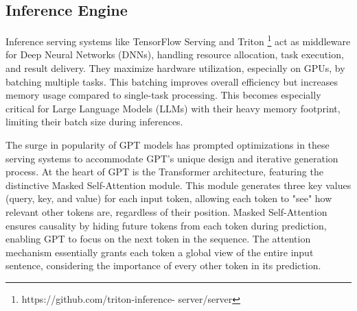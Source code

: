 

\subsection{Inference Engine}

Inference serving systems like TensorFlow Serving \cite{olston2017tensorflow} and Triton \footnote{https://github.com/triton-inference-
server/server} act as middleware for Deep Neural Networks (DNNs), handling resource allocation, task execution, and result delivery. They maximize hardware utilization, especially on GPUs, by batching multiple tasks. This batching improves overall efficiency but increases memory usage compared to single-task processing. This becomes especially critical for Large Language Models (LLMs) with their heavy memory footprint, limiting their batch size during inferences.

The surge in popularity of GPT models has prompted optimizations in these serving systems to accommodate GPT's unique design and iterative generation process. At the heart of GPT is the Transformer architecture, featuring the distinctive Masked Self-Attention module. This module generates three key values (query, key, and value) for each input token, allowing each token to "see" how relevant other tokens are, regardless of their position. Masked Self-Attention ensures causality by hiding future tokens from each token during prediction, enabling GPT to focus on the next token in the sequence. The attention mechanism essentially grants each token a global view of the entire input sentence, considering the importance of every other token in its prediction.


